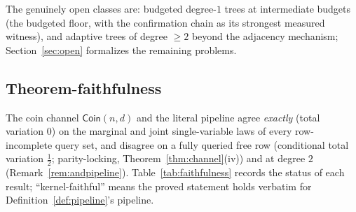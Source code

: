 \documentclass[11pt]{article}
\theoremstyle{definition}
\theoremstyle{remark}
\begin{document}
The genuinely open classes are: budgeted degree-$1$ trees at
intermediate budgets (the budgeted floor, with the confirmation chain
as its strongest measured witness), and adaptive trees of degree
$\ge2$ beyond the adjacency mechanism; Section~\ref{sec:open}
formalizes the remaining problems.

\subsection{Theorem-faithfulness}\label{sec:faithfulness}

The coin channel $\mathsf{Coin}(n,d)$ and the literal pipeline agree
\emph{exactly} (total variation $0$) on the marginal and joint
single-variable laws of every row-incomplete query set, and disagree
on a fully queried free row (conditional total variation $\tfrac12$;
parity-locking, Theorem~\ref{thm:channel}(iv)) and at degree $2$
(Remark~\ref{rem:andpipeline}).  Table~\ref{tab:faithfulness} records
the status of each result; ``kernel-faithful'' means the proved
statement holds verbatim for Definition~\ref{def:pipeline}'s pipeline.
\end{document}
